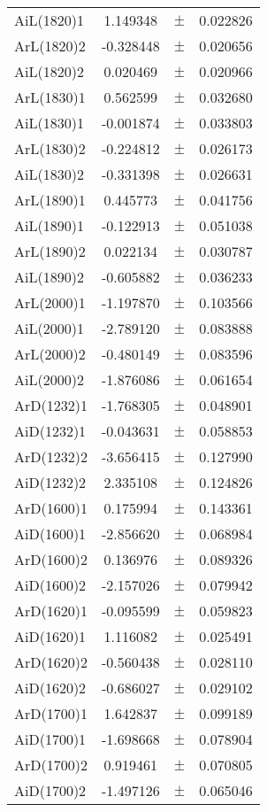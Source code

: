 \begin{table}
\begin{tiny}
\begin{tabular}{lccc}
AiL(1820)1 & 1.149348 & $\pm$ & 0.022826 \\
ArL(1820)2 & -0.328448 & $\pm$ & 0.020656 \\
AiL(1820)2 & 0.020469 & $\pm$ & 0.020966 \\
ArL(1830)1 & 0.562599 & $\pm$ & 0.032680 \\
AiL(1830)1 & -0.001874 & $\pm$ & 0.033803 \\
ArL(1830)2 & -0.224812 & $\pm$ & 0.026173 \\
AiL(1830)2 & -0.331398 & $\pm$ & 0.026631 \\
ArL(1890)1 & 0.445773 & $\pm$ & 0.041756 \\
AiL(1890)1 & -0.122913 & $\pm$ & 0.051038 \\
ArL(1890)2 & 0.022134 & $\pm$ & 0.030787 \\
AiL(1890)2 & -0.605882 & $\pm$ & 0.036233 \\
ArL(2000)1 & -1.197870 & $\pm$ & 0.103566 \\
AiL(2000)1 & -2.789120 & $\pm$ & 0.083888 \\
ArL(2000)2 & -0.480149 & $\pm$ & 0.083596 \\
AiL(2000)2 & -1.876086 & $\pm$ & 0.061654 \\
ArD(1232)1 & -1.768305 & $\pm$ & 0.048901 \\
AiD(1232)1 & -0.043631 & $\pm$ & 0.058853 \\
ArD(1232)2 & -3.656415 & $\pm$ & 0.127990 \\
AiD(1232)2 & 2.335108 & $\pm$ & 0.124826 \\
ArD(1600)1 & 0.175994 & $\pm$ & 0.143361 \\
AiD(1600)1 & -2.856620 & $\pm$ & 0.068984 \\
ArD(1600)2 & 0.136976 & $\pm$ & 0.089326 \\
AiD(1600)2 & -2.157026 & $\pm$ & 0.079942 \\
ArD(1620)1 & -0.095599 & $\pm$ & 0.059823 \\
AiD(1620)1 & 1.116082 & $\pm$ & 0.025491 \\
ArD(1620)2 & -0.560438 & $\pm$ & 0.028110 \\
AiD(1620)2 & -0.686027 & $\pm$ & 0.029102 \\
ArD(1700)1 & 1.642837 & $\pm$ & 0.099189 \\
AiD(1700)1 & -1.698668 & $\pm$ & 0.078904 \\
ArD(1700)2 & 0.919461 & $\pm$ & 0.070805 \\
AiD(1700)2 & -1.497126 & $\pm$ & 0.065046 \\
\bottomrule
\end{tabular}
\end{tiny}
\end{table}

